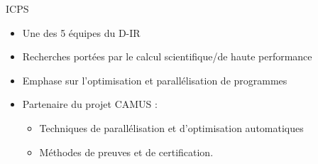 \documentclass[5pt, compress]{beamer}
\makeatletter
\newcommand*{\currentname}{\@currentlabelname}
\makeatother
\begin{document}
    \begin{frame}{\currentname}
        \begin{block}{ICPS}
            \begin{itemize}
                \item Une des 5 équipes du D-IR
                \item Recherches portées par le calcul scientifique/de haute performance
                \item Emphase sur l'optimisation et parallélisation de programmes
                \item Partenaire du projet CAMUS : 
                    \begin{itemize}
                        \item Techniques de parallélisation et d’optimisation automatiques
                        \item Méthodes de preuves et de certification.
                    \end{itemize}

            \end{itemize}
        \end{block}
    \end{frame}
\end{document}
